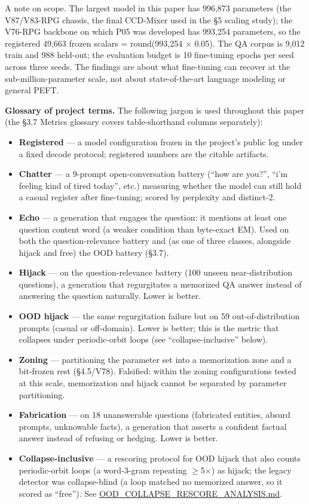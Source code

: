 \documentclass[11pt]{article}
\begin{document}
A note on scope. The largest model in this paper has 996{,}873 parameters (the V87/V83-RPG chassis, the final CCD-Mixer used in the \S5 scaling study); the V76-RPG backbone on which P05 was developed has 993{,}254 parameters, so the registered 49{,}663 frozen scalars = round(993{,}254 $\times$ 0.05). The QA corpus is 9{,}012 train and 988 held-out; the evaluation budget is 10 fine-tuning epochs per seed across three seeds. The findings are about what fine-tuning can recover at the sub-million-parameter scale, not about state-of-the-art language modeling or general PEFT.

\textbf{Glossary of project terms.} The following jargon is used throughout this paper (the \S3.7 Metrics glossary covers table-shorthand columns separately):

\begin{itemize}
\item \textbf{Registered} --- a model configuration frozen in the project's public log under a fixed decode protocol; registered numbers are the citable artifacts.
\item \textbf{Chatter} --- a 9-prompt open-conversation battery (``how are you?'', ``i'm feeling kind of tired today'', etc.) measuring whether the model can still hold a casual register after fine-tuning; scored by perplexity and distinct-2.
\item \textbf{Echo} --- a generation that engages the question: it mentions at least one question content word (a weaker condition than byte-exact EM). Used on both the question-relevance battery and (as one of three classes, alongside hijack and free) the OOD battery (\S3.7).
\item \textbf{Hijack} --- on the question-relevance battery (100 unseen near-distribution questions), a generation that regurgitates a memorized QA answer instead of answering the question naturally. Lower is better.
\item \textbf{OOD hijack} --- the same regurgitation failure but on 59 out-of-distribution prompts (casual or off-domain). Lower is better; this is the metric that collapses under periodic-orbit loops (see ``collapse-inclusive'' below).
\item \textbf{Zoning} --- partitioning the parameter set into a memorization zone and a bit-frozen rest (\S4.5/V78). Falsified: within the zoning configurations tested at this scale, memorization and hijack cannot be separated by parameter partitioning.
\item \textbf{Fabrication} --- on 18 unanswerable questions (fabricated entities, absurd prompts, unknowable facts), a generation that asserts a confident factual answer instead of refusing or hedging. Lower is better.
\item \textbf{Collapse-inclusive} --- a rescoring protocol for OOD hijack that also counts periodic-orbit loops (a word-3-gram repeating $\geq$5$\times$) as hijack; the legacy detector was collapse-blind (a loop matched no memorized answer, so it scored as ``free''). See \href{https://github.com/llaa33219/MicroMixer-4/blob/4bb630413dfa58ef3141291e121ab8c006d03235/OOD_COLLAPSE_RESCORE_ANALYSIS.md}{OOD\_COLLAPSE\_RESCORE\_ANALYSIS.md}.
\end{itemize}
\end{document}
